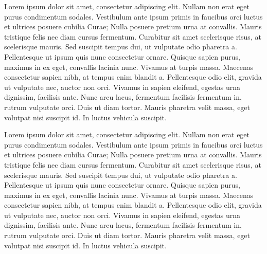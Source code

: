 
Lorem ipsum dolor sit amet, consectetur adipiscing elit. Nullam non erat eget purus condimentum sodales. Vestibulum ante ipsum primis in faucibus orci luctus et ultrices posuere cubilia Curae; Nulla posuere pretium urna at convallis. Mauris tristique felis nec diam cursus fermentum. Curabitur sit amet scelerisque risus, at scelerisque mauris. Sed suscipit tempus dui, ut vulputate odio pharetra a. Pellentesque ut ipsum quis nunc consectetur ornare. Quisque sapien purus, maximus in ex eget, convallis lacinia nunc. Vivamus at turpis massa. Maecenas consectetur sapien nibh, at tempus enim blandit a. Pellentesque odio elit, gravida ut vulputate nec, auctor non orci. Vivamus in sapien eleifend, egestas urna dignissim, facilisis ante. Nunc arcu lacus, fermentum facilisis fermentum in, rutrum vulputate orci. Duis ut diam tortor. Mauris pharetra velit massa, eget volutpat nisi suscipit id. In luctus vehicula suscipit.

Lorem ipsum dolor sit amet, consectetur adipiscing elit. Nullam non erat eget purus condimentum sodales. Vestibulum ante ipsum primis in faucibus orci luctus et ultrices posuere cubilia Curae; Nulla posuere pretium urna at convallis. Mauris tristique felis nec diam cursus fermentum. Curabitur sit amet scelerisque risus, at scelerisque mauris. Sed suscipit tempus dui, ut vulputate odio pharetra a. Pellentesque ut ipsum quis nunc consectetur ornare. Quisque sapien purus, maximus in ex eget, convallis lacinia nunc. Vivamus at turpis massa. Maecenas consectetur sapien nibh, at tempus enim blandit a. Pellentesque odio elit, gravida ut vulputate nec, auctor non orci. Vivamus in sapien eleifend, egestas urna dignissim, facilisis ante. Nunc arcu lacus, fermentum facilisis fermentum in, rutrum vulputate orci. Duis ut diam tortor. Mauris pharetra velit massa, eget volutpat nisi suscipit id. In luctus vehicula suscipit.
